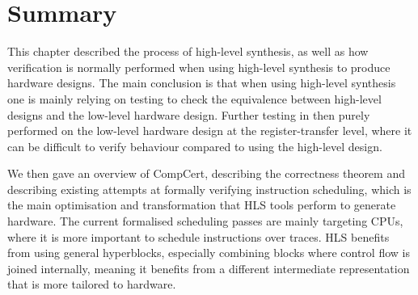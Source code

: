 
%

\section{Summary}%
\label{sec:bg:summary}

This chapter described the process of high-level synthesis, as well as how
verification is normally performed when using high-level synthesis to produce
hardware designs.  The main conclusion is that when using high-level synthesis
one is mainly relying on testing to check the equivalence between high-level
designs and the low-level hardware design.  Further testing in then purely
performed on the low-level hardware design at the register-transfer level, where
it can be difficult to verify behaviour compared to using the high-level design.

We then gave an overview of CompCert, describing the correctness theorem and
describing existing attempts at formally verifying instruction scheduling, which
is the main optimisation and transformation that \gls{HLS} tools perform to
generate hardware.  The current formalised scheduling passes are mainly
targeting \glspl{CPU}, where it is more important to schedule instructions over
traces.  \gls{HLS} benefits from using general hyperblocks, especially combining
blocks where control flow is joined internally, meaning it benefits from a
different intermediate representation that is more tailored to hardware.

